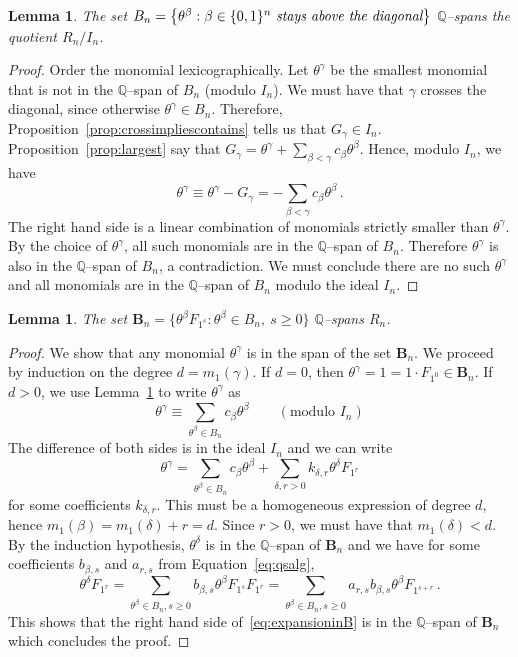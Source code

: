 \documentclass[11pt]{amsart}
\newtheorem{lemma}[theorem]{Lemma}
\theoremstyle{definition}
\numberwithin{equation}{section}
\begin{document}
\begin{lemma}\label{lem:spanofquotient}
The set $B_n=\big\{ \theta^\beta : \beta \in \{0,1\}^n \text{ \it stays above the diagonal}\big\}$
$\mathbb Q$--spans the quotient $R_n\big/I_n$.
\end{lemma}

\begin{proof}
Order the monomial lexicographically. Let  $\theta^\gamma$ be the smallest monomial that is not in the $\mathbb Q$--span of $B_n$
(modulo  $I_n$). We must have  that $\gamma$ crosses the  diagonal, since otherwise $\theta^\gamma\in  B_n$. Therefore, Proposition~\ref{prop:crossimpliescontains}
tells us  that $G_\gamma \in I_n$. Proposition~\ref{prop:largest} say that $G_\gamma = \theta^\gamma + \sum_{\beta<\gamma}  c_\beta \theta^\beta$. Hence, modulo $I_n$, we have
$$ \theta^\gamma \equiv \theta^\gamma - G_\gamma = - \sum_{\beta<\gamma} c_\beta \theta^\beta\,.$$
The right hand side is a linear combination of monomials strictly smaller than $\theta^\gamma$.
By the choice of $\theta^\gamma$, all such monomials are in the $\mathbb Q$--span of $B_n$.
 Therefore $\theta^\gamma$ is also in the $\mathbb Q$--span of $B_n$, a contradiction. We must conclude there are no such $\theta^\gamma$ and all monomials are in the $\mathbb Q$--span of $B_n$ modulo the ideal $I_n$.
\end{proof}

\begin{lemma}\label{lem:spanofpolynomials}
 The set ${\mathbf B}_n=\big\{ \theta^\beta F_{1^s} : \theta^\beta \in B_n,\  s\ge 0\big\}$ $\mathbb Q$--spans $R_n$.
\end{lemma}

\begin{proof} 
We show that any monomial $\theta^\gamma$ is in the span of the set ${\mathbf B}_n$.
We proceed by induction on the degree $d=m_1(\gamma)$. If $d=0$, then $\theta^\gamma = 1 = 1\cdot F_{1^0} \in {\mathbf B}_n$.
If $d>0$, we use Lemma~\ref{lem:spanofquotient} to write $\theta^\gamma$ as
$$ \theta^\gamma \equiv \sum_{\theta^\beta\in B_n}  c_\beta \theta^\beta\qquad (\text{modulo $I_n$})$$
The difference of both sides is in the ideal $I_n$ and we can write
\begin{equation}\label{eq:expansioninB}
\theta^\gamma = \sum_{\theta^\beta\in B_n}  c_\beta \theta^\beta
+ \sum_{\delta, r>0} k_{\delta,r} \theta^\delta F_{1^r}
\end{equation}
for some coefficients $k_{\delta,r}$.
This must be a homogeneous expression of degree $d$, hence $m_1(\beta) = m_1(\delta) + r = d$.
Since $r>0$, we must have that $m_1(\delta)<d$. By the induction hypothesis,
$\theta^\delta$ is in the $\mathbb Q$--span of ${\mathbf B}_n$ and we have
for some coefficients $b_{\beta,s}$ and $a_{r,s}$ from Equation~\eqref{eq:qsalg},
$$\theta^\delta F_{1^r} = \sum_{\theta^\beta\in B_n, s\ge 0} b_{\beta,s} \theta^\beta F_{1^s} F_{1^r} =  \sum_{\theta^\beta\in B_n, s\ge 0} a_{r,s} b_{\beta,s} \theta^\beta F_{1^{s+r}} \,.$$
This shows that the right hand side of~\eqref{eq:expansioninB}
is in the $\mathbb Q$--span of ${\mathbf B}_n$ which concludes the proof.
\end{proof}
\end{document}
